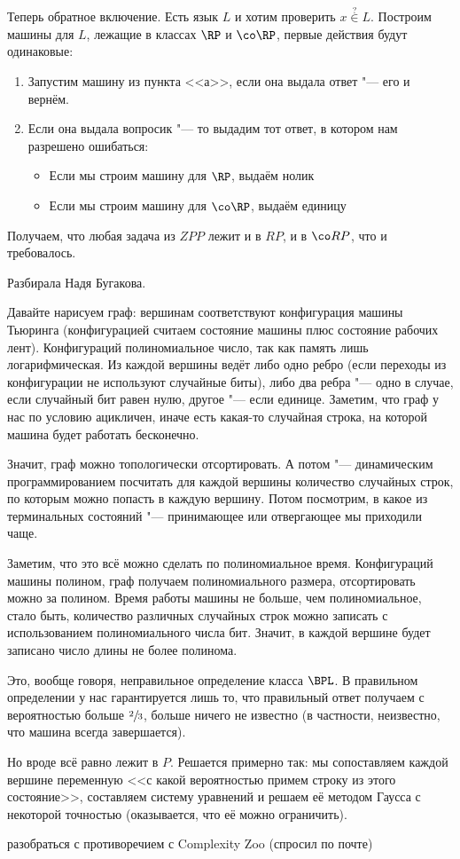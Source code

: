 	Теперь обратное включение.
	Есть язык $L$ и хотим проверить $x \stackrel{?}{\in} L$.
	Построим машины для $L$, лежащие в классах $\RP$ и $\co\RP$, первые действия будут одинаковые:
	\begin{enumerate}
		\item Запустим машину из пункта <<а>>, если она выдала ответ "--- его и вернём.
		\item Если она выдала вопросик "--- то выдадим тот ответ, в котором нам разрешено ошибаться:
			\begin{itemize}
				\item
					Если мы строим машину для $\RP$, выдаём нолик
				\item
					Если мы строим машину для $\co\RP$, выдаём единицу
			\end{itemize}
	\end{enumerate}
	Получаем, что любая задача из $ZPP$ лежит и в $RP$, и в $\co RP$, что и требовалось.

	Разбирала Надя Бугакова.

	Давайте нарисуем граф: вершинам соответствуют конфигурация машины Тьюринга (конфигурацией
	считаем состояние машины плюс состояние рабочих лент).
	Конфигураций полиномиальное число, так как память лишь логарифмическая.
	Из каждой вершины ведёт либо одно ребро (если переходы из конфигурации не используют случайные биты),
	либо два ребра "--- одно в случае, если случайный бит равен нулю, другое "--- если единице.
	Заметим, что граф у нас по условию ацикличен, иначе есть какая-то случайная строка, на которой машина будет работать бесконечно.

	Значит, граф можно топологически отсортировать.
	А потом "--- динамическим программированием посчитать для каждой вершины количество случайных строк,
	по которым можно попасть в каждую вершину.
	Потом посмотрим, в какое из терминальных состояний "--- принимающее или отвергающее мы приходили чаще.

	Заметим, что это всё можно сделать по полиномиальное время.
	Конфигураций машины полином, граф получаем полиномиального размера, отсортировать можно за полином.
	Время работы машины не больше, чем полиномиальное, стало быть, количество
	различных случайных строк можно записать с использованием полиномиального числа бит.
	Значит, в каждой вершине будет записано число длины не более полинома.

	\begin{Rem}
		Это, вообще говоря, неправильное определение класса $\BPL$.
		В правильном определении у нас гарантируется лишь 
		то, что правильный ответ получаем с вероятностью больше $\sfrac 23$, больше ничего не известно
		(в частности, неизвестно, что машина всегда завершается).

		Но вроде всё равно лежит в $P$.
		Решается примерно так: мы сопоставляем каждой вершине переменную <<с какой вероятностью
		примем строку из этого состояние>>, составляем систему уравнений и решаем
		её методом Гаусса с некоторой точностью (оказывается, что её можно ограничить).

		\TODO разобраться с противоречием с Complexity Zoo (спросил по почте)
	\end{Rem}

